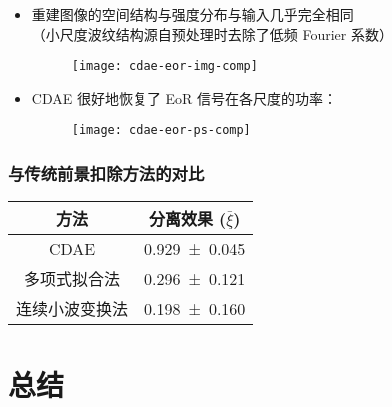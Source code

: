 \documentclass{beamer}
\begin{document}
\begin{frame}
  \vspace{1ex}
  \begin{itemize}
    \item 重建图像的空间结构与强度分布与输入几乎完全相同 \\
      {\small（小尺度波纹结构源自预处理时去除了低频 Fourier 系数）}
      \begin{figure}
        \centering
        \texttt{[image: cdae-eor-img-comp]}
      \end{figure}
    \item CDAE 很好地恢复了 EoR 信号在各尺度的功率：
      \begin{figure}
        \centering
        \texttt{[image: cdae-eor-ps-comp]}
      \end{figure}
  \end{itemize}
\end{frame}

\begin{frame}[subsec]
  \frametitle{与传统前景扣除方法的对比}
  \begin{table}
    \centering
    \begin{tabular}{cc}
      \toprule
      方法 & 分离效果 ($\bar{\xi}$) \\
      \midrule
      CDAE & \num{0.929 +- 0.045} \\
      \midrule
      多项式拟合法 & \num{0.296 +- 0.121} \\
      连续小波变换法 & \num{0.198 +- 0.160} \\
      \bottomrule
    \end{tabular}
  \end{table}
\end{frame}


\section{总结}
\end{document}
